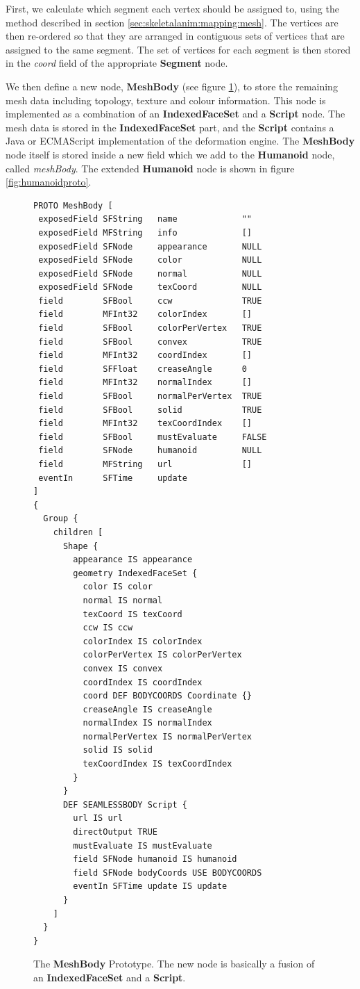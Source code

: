 First, we calculate which segment each vertex should be assigned to, using the method described in section \ref{sec:skeletalanim:mapping:mesh}. The vertices are then re-ordered so that they are arranged in contiguous sets of vertices that are assigned to the same segment. The set of vertices for each segment is then stored in the {\it coord} field of the appropriate {\bf Segment} node.

We then define a new node, {\bf MeshBody}  (see figure \ref{fig:meshbodyproto}), to store the remaining mesh data including topology, texture and colour information. This node is implemented as a combination of an {\bf IndexedFaceSet} and a {\bf Script} node. The mesh data is stored in the {\bf IndexedFaceSet} part, and the {\bf Script} contains a Java or ECMAScript implementation of the deformation engine. The {\bf MeshBody} node itself is stored inside a new field which we add to the {\bf Humanoid} node, called {\it meshBody}. The extended {\bf Humanoid} node is shown in figure \ref{fig:humanoidproto}.

\begin{figure}
\renewcommand{\baselinestretch}{1}
\scriptsize
\begin{verbatim}
PROTO MeshBody [
 exposedField SFString   name             ""
 exposedField MFString   info             []
 exposedField SFNode     appearance       NULL
 exposedField SFNode     color            NULL
 exposedField SFNode     normal           NULL
 exposedField SFNode     texCoord         NULL     
 field        SFBool     ccw              TRUE
 field        MFInt32    colorIndex       []
 field        SFBool     colorPerVertex	  TRUE
 field        SFBool     convex           TRUE
 field        MFInt32    coordIndex       []
 field        SFFloat    creaseAngle      0
 field        MFInt32    normalIndex      []
 field        SFBool     normalPerVertex  TRUE
 field        SFBool     solid            TRUE
 field        MFInt32    texCoordIndex    []
 field        SFBool     mustEvaluate     FALSE
 field        SFNode     humanoid         NULL
 field        MFString   url              []
 eventIn      SFTime     update
]
{
  Group {
    children [
      Shape {
        appearance IS appearance
        geometry IndexedFaceSet {
          color IS color
          normal IS normal
          texCoord IS texCoord
          ccw IS ccw
          colorIndex IS colorIndex
          colorPerVertex IS colorPerVertex
          convex IS convex
          coordIndex IS coordIndex
          coord DEF BODYCOORDS Coordinate {}
          creaseAngle IS creaseAngle
          normalIndex IS normalIndex
          normalPerVertex IS normalPerVertex
          solid IS solid
          texCoordIndex IS texCoordIndex
        }
      }
      DEF SEAMLESSBODY Script {
        url IS url
        directOutput TRUE
        mustEvaluate IS mustEvaluate
        field SFNode humanoid IS humanoid
        field SFNode bodyCoords USE BODYCOORDS
        eventIn SFTime update IS update
      }
    ]
  }
}
\end{verbatim}
\caption[The MeshBody Prototype]{\label{fig:meshbodyproto} The {\bf MeshBody} Prototype. The new node is basically a fusion of an {\bf IndexedFaceSet} and a {\bf Script}.}
\end{figure}

